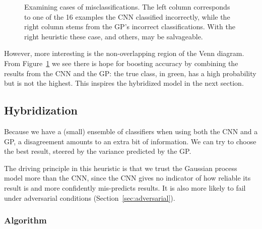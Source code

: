 \documentclass{article}
\begin{document}
\begin{figure}[htb]
\begin{minipage}[c]{.49\hsize}
\end{minipage} %
\caption{Examining cases of misclassifications. The left column corresponds to one of the 16 examples the CNN classified incorrectly, while the right column stems from the GP's incorrect classifications. With the right heuristic these case, and others, may be salvageable.}
\label{fig:mnist:mismatch}
\end{figure}

However, more interesting is the non-overlapping region of the Venn diagram. From Figure~\ref{fig:mnist:mismatch} we see there is hope for boosting accuracy by combining the results from the CNN and the GP: the true class, in green, has a high probability but is not the highest. This inspires the hybridized model in the next section.


\subsection{Hybridization}
\label{sec:mnist:hybridization}

Because we have a (small) ensemble of classifiers when using both the CNN and a GP, a disagreement amounts to an extra bit of information. We can try to choose the best result, steered by the variance predicted by the GP.

The driving principle in this heuristic is that we trust the Gaussian process model more than the CNN, since the CNN gives no indicator of how reliable its result is and more confidently mis-predicts results. It is also more likely to fail under adversarial conditions (Section~\ref{sec:adversarial}).

\subsubsection{Algorithm}
\label{sec:mnist:hybridization:criteria}
\end{document}
